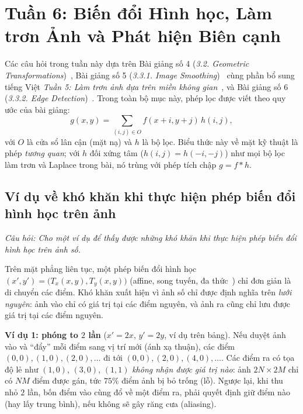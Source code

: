 \section{Tuần 6: Biến đổi Hình học, Làm trơn Ảnh và Phát hiện Biên cạnh}
\label{sec:week6}

Các câu hỏi trong tuần này dựa trên Bài giảng số 4 (\emph{3.2. Geometric Transformations})~\citep{xlav_lec4}, Bài giảng số 5 (\emph{3.3.1. Image Smoothing})~\citep{xlav_lec5} cùng phần bổ sung tiếng Việt \emph{Tuần 5: Làm trơn ảnh dựa trên miền không gian}~\citep{xlav_lec5b}, và Bài giảng số 6 (\emph{3.3.2. Edge Detection})~\citep{xlav_lec6}. Trong toàn bộ mục này, phép lọc được viết theo quy ước của bài giảng:
\begin{equation}
g(x, y) = \sum_{(i, j) \in O} f(x + i, y + j)\,h(i, j),
\label{eq:w6_filter}
\end{equation}
với $O$ là cửa sổ lân cận (mặt nạ) và $h$ là bộ lọc. Biểu thức này về mặt kỹ thuật là phép \emph{tương quan}; với $h$ đối xứng tâm ($h(i, j) = h(-i, -j)$) như mọi bộ lọc làm trơn và Laplace trong bài, nó trùng với phép tích chập $g = f * h$.

\subsection{Ví dụ về khó khăn khi thực hiện phép biến đổi hình học trên ảnh}
\label{subsec:w6_geo_difficulty}

\textit{Câu hỏi: Cho một ví dụ để thấy được những khó khăn khi thực hiện phép biến đổi hình học trên ảnh số.}

Trên mặt phẳng liên tục, một phép biến đổi hình học $(x', y') = \big(T_x(x, y), T_y(x, y)\big)$ (affine, song tuyến, đa thức~\citep{xlav_lec4}) chỉ đơn giản là di chuyển các điểm. Khó khăn xuất hiện vì ảnh số chỉ được định nghĩa trên \emph{lưới nguyên}: ảnh vào chỉ có giá trị tại các điểm nguyên, và ảnh ra cũng chỉ lưu được giá trị tại các điểm nguyên.

\textbf{Ví dụ 1: phóng to $2$ lần} ($x' = 2x$, $y' = 2y$, ví dụ trên bảng). Nếu duyệt ảnh vào và ``đẩy'' mỗi điểm sang vị trí mới (ánh xạ thuận), các điểm $(0, 0), (1, 0), (2, 0), \ldots$ đi tới $(0, 0), (2, 0), (4, 0), \ldots$. Các điểm ra có tọa độ lẻ như $(1, 0)$, $(3, 0)$, $(1, 1)$ \emph{không nhận được giá trị nào}: ảnh $2N \times 2M$ chỉ có $NM$ điểm được gán, tức $75\%$ điểm ảnh bị bỏ trống (lỗ). Ngược lại, khi thu nhỏ $2$ lần, bốn điểm vào cùng đổ về một điểm ra, phải quyết định giữ điểm nào (hay lấy trung bình), nếu không sẽ gây răng cưa (aliasing).

